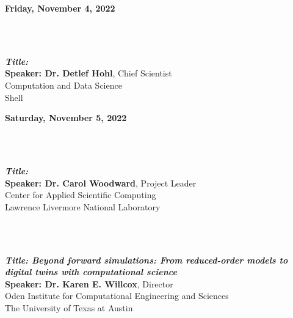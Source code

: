 \begin{center}
\large \bf Friday, November 4, 2022
\end{center}


\\[-10pt]
\\[-6pt]
\hspace*{0.13\textwidth}\parbox{0.94\textwidth}{{\bfseries\itshape Title:}\\
{\bf Speaker: Dr. Detlef Hohl}, Chief Scientist\\
\hspace*{1.6cm}Computation and Data Science\\
\hspace*{1.6cm}Shell
}\vspace{2ex}




\begin{center}
\large \bf Saturday, November 5, 2022
\end{center}

\\[-10pt]
\\[-6pt]
\hspace*{0.13\textwidth}\parbox{0.94\textwidth}{{\bfseries\itshape Title:}\\
{\bf Speaker: Dr. Carol Woodward}, Project Leader\\
\hspace*{1.6cm}Center for Applied Scientific Computing\\
\hspace*{1.6cm}Lawrence Livermore National Laboratory
}\vspace{2ex}
\\[-10pt]
\\[-6pt]
\hspace*{0.13\textwidth}\parbox{0.80\textwidth}{{\bfseries\itshape Title: Beyond forward simulations: From reduced-order models to digital twins with com\-pu\-tatio\-nal science}\\
{\bf Speaker: Dr. Karen E. Willcox}, Director\\
\hspace*{1.6cm}Oden Institute for Computational Engineering and Sciences\\
\hspace*{1.6cm}The University of Texas at Austin
}\hspace{0.20\textwidth}\vspace{2ex}

